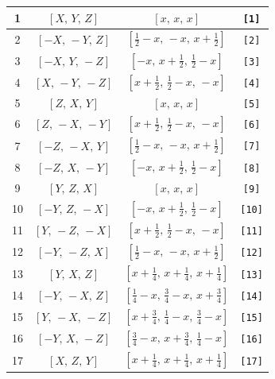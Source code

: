 \documentclass[fleqn,8pt]{jsarticle}
\begin{document}
\begin{longtable}{cccc}
1 & $\left[ X,\, Y,\, Z \right]$ & $\left[ x,\, x,\, x \right]$ & {\tt [1]} \\ \hline
2 & $\left[ - X,\, - Y,\, Z \right]$ & $\left[ \frac{1}{2} - x,\, - x,\, x + \frac{1}{2} \right]$ & {\tt [2]} \\ \hline
3 & $\left[ - X,\, Y,\, - Z \right]$ & $\left[ - x,\, x + \frac{1}{2},\, \frac{1}{2} - x \right]$ & {\tt [3]} \\ \hline
4 & $\left[ X,\, - Y,\, - Z \right]$ & $\left[ x + \frac{1}{2},\, \frac{1}{2} - x,\, - x \right]$ & {\tt [4]} \\ \hline
5 & $\left[ Z,\, X,\, Y \right]$ & $\left[ x,\, x,\, x \right]$ & {\tt [5]} \\ \hline
6 & $\left[ Z,\, - X,\, - Y \right]$ & $\left[ x + \frac{1}{2},\, \frac{1}{2} - x,\, - x \right]$ & {\tt [6]} \\ \hline
7 & $\left[ - Z,\, - X,\, Y \right]$ & $\left[ \frac{1}{2} - x,\, - x,\, x + \frac{1}{2} \right]$ & {\tt [7]} \\ \hline
8 & $\left[ - Z,\, X,\, - Y \right]$ & $\left[ - x,\, x + \frac{1}{2},\, \frac{1}{2} - x \right]$ & {\tt [8]} \\ \hline
9 & $\left[ Y,\, Z,\, X \right]$ & $\left[ x,\, x,\, x \right]$ & {\tt [9]} \\ \hline
10 & $\left[ - Y,\, Z,\, - X \right]$ & $\left[ - x,\, x + \frac{1}{2},\, \frac{1}{2} - x \right]$ & {\tt [10]} \\ \hline
11 & $\left[ Y,\, - Z,\, - X \right]$ & $\left[ x + \frac{1}{2},\, \frac{1}{2} - x,\, - x \right]$ & {\tt [11]} \\ \hline
12 & $\left[ - Y,\, - Z,\, X \right]$ & $\left[ \frac{1}{2} - x,\, - x,\, x + \frac{1}{2} \right]$ & {\tt [12]} \\ \hline
13 & $\left[ Y,\, X,\, Z \right]$ & $\left[ x + \frac{1}{4},\, x + \frac{1}{4},\, x + \frac{1}{4} \right]$ & {\tt [13]} \\ \hline
14 & $\left[ - Y,\, - X,\, Z \right]$ & $\left[ \frac{1}{4} - x,\, \frac{3}{4} - x,\, x + \frac{3}{4} \right]$ & {\tt [14]} \\ \hline
15 & $\left[ Y,\, - X,\, - Z \right]$ & $\left[ x + \frac{3}{4},\, \frac{1}{4} - x,\, \frac{3}{4} - x \right]$ & {\tt [15]} \\ \hline
16 & $\left[ - Y,\, X,\, - Z \right]$ & $\left[ \frac{3}{4} - x,\, x + \frac{3}{4},\, \frac{1}{4} - x \right]$ & {\tt [16]} \\ \hline
17 & $\left[ X,\, Z,\, Y \right]$ & $\left[ x + \frac{1}{4},\, x + \frac{1}{4},\, x + \frac{1}{4} \right]$ & {\tt [17]} \\ \hline

\end{longtable}
\end{document}
